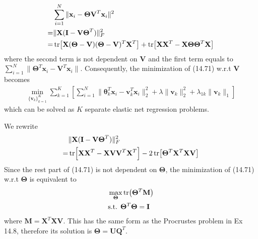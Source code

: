 \begin{exercise}
  \begin{exerciseSection}
    \begin{align}
      & \sum_{i=1}^N \|\mathbf{x}_i - \mathbf{\Theta V}^T\mathbf{x}_i\|^2 \notag
      \\
      = & \|\mathbf{X}(\mathbf{I} - \mathbf{V\Theta}^T)\|_F^2 \notag \\
      = & \tr[\mathbf{X}(\mathbf{\Theta} - \mathbf{V})(\mathbf{\Theta} -
      \mathbf{V})^T\mathbf{X}^T] + \tr[\mathbf{X}\mathbf{X}^T -
      \mathbf{X}\mathbf{\Theta}\mathbf{\Theta}^T\mathbf{X}]
    \end{align}
    where the second term is not dependent on $\mathbf{V}$ and the first term
    equals to $\sum_{i=1}^N\|\mathbf{\Theta}^T\mathbf{x}_i -
    \mathbf{V}^T\mathbf{x}_i\|$. Consequently, the minimization of (14.71)
    w.r.t $\mathbf{V}$ becomes
    \begin{align}
      \min_{\{\mathbf{v}_k\}_{k=1}^K}\sum_{k=1}^K
      \left[ \sum_{i=1}^N \|\bm{\theta}_k^T\mathbf{x}_i -
      \mathbf{v}_k^T\mathbf{x}_i\|_2^2 + \lambda\|\mathbf{v}_k\|_2^2 +
      \lambda_{1k}\|\mathbf{v}_k\|_1\right]
    \end{align}
    which can be solved as $K$ separate elastic net regression problems.
  \end{exerciseSection}
  
  \begin{exerciseSection}
    We rewrite
    \begin{align}
      & \|\mathbf{X}(\mathbf{I} - \mathbf{V\Theta}^T)\|_F^2 \notag \\
      = & \tr[\mathbf{X}\mathbf{X}^T - \mathbf{XVV}^T\mathbf{X}^T] -
      2\tr[\mathbf{\Theta}^T\mathbf{X}^T\mathbf{XV}]
    \end{align}
    Since the rest part of (14.71) is not dependent on $\mathbf{\Theta}$, the
    minimization of (14.71) w.r.t $\mathbf{\Theta}$ is equivalent to
    \begin{align}
      & \max_{\mathbf{\Theta}} \tr(\mathbf{\Theta}^T\mathbf{M}) \\
      & \mbox{s.t. } \mathbf{\Theta}^T\mathbf{\Theta} = \mathbf{I} \notag
    \end{align}
    where $\mathbf{M} = \mathbf{X}^T\mathbf{XV}$. This has the same form as the
    Procrustes problem in Ex 14.8, therefore its solution is $\mathbf{\Theta} =
    \mathbf{U}\mathbf{Q}^T$.
  \end{exerciseSection}
\end{exercise}

